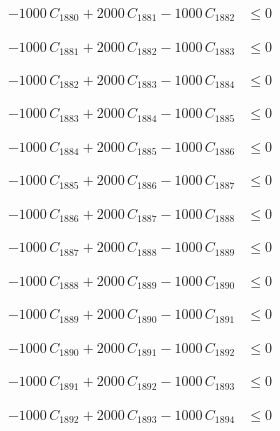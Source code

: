 \documentclass[a4paper,11pt]{article}
\begin{document}
\begin{align}
-1000\,C_{1880} + 2000\,C_{1881} - 1000\,C_{1882} &\leq 0 \nonumber
\end{align}

\begin{align}
-1000\,C_{1881} + 2000\,C_{1882} - 1000\,C_{1883} &\leq 0 \nonumber
\end{align}

\begin{align}
-1000\,C_{1882} + 2000\,C_{1883} - 1000\,C_{1884} &\leq 0 \nonumber
\end{align}

\begin{align}
-1000\,C_{1883} + 2000\,C_{1884} - 1000\,C_{1885} &\leq 0 \nonumber
\end{align}

\begin{align}
-1000\,C_{1884} + 2000\,C_{1885} - 1000\,C_{1886} &\leq 0 \nonumber
\end{align}

\begin{align}
-1000\,C_{1885} + 2000\,C_{1886} - 1000\,C_{1887} &\leq 0 \nonumber
\end{align}

\begin{align}
-1000\,C_{1886} + 2000\,C_{1887} - 1000\,C_{1888} &\leq 0 \nonumber
\end{align}

\begin{align}
-1000\,C_{1887} + 2000\,C_{1888} - 1000\,C_{1889} &\leq 0 \nonumber
\end{align}

\begin{align}
-1000\,C_{1888} + 2000\,C_{1889} - 1000\,C_{1890} &\leq 0 \nonumber
\end{align}

\begin{align}
-1000\,C_{1889} + 2000\,C_{1890} - 1000\,C_{1891} &\leq 0 \nonumber
\end{align}

\begin{align}
-1000\,C_{1890} + 2000\,C_{1891} - 1000\,C_{1892} &\leq 0 \nonumber
\end{align}

\begin{align}
-1000\,C_{1891} + 2000\,C_{1892} - 1000\,C_{1893} &\leq 0 \nonumber
\end{align}

\begin{align}
-1000\,C_{1892} + 2000\,C_{1893} - 1000\,C_{1894} &\leq 0 \nonumber
\end{align}
\end{document}
